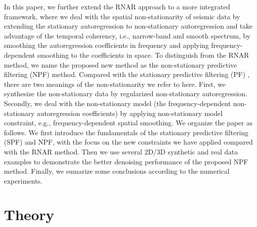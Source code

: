 In this paper, we further extend the RNAR approach to a more integrated framework, where we deal with the spatial non-stationarity of seismic data by extending the stationary autoregression to non-stationary autoregression and take advantage of the temporal coherency, i.e., narrow-band and smooth spectrum, by smoothing the autoregression coefficients in frequency and applying frequency-dependent smoothing to the coefficients in space.  To distinguish from the RNAR method, we name the proposed new method as the non-stationary predictive filtering (NPF) method. Compared with the stationary predictive filtering (PF) \cite[]{canales1984}, there are two meanings of the non-stationarity we refer to here. First, we synthesize the non-stationary data by regularized non-stationary autoregression. Secondly, we deal with the non-stationary model (the frequency-dependent non-stationary autoregression coefficients) by applying non-stationary model constraint, e.g., frequency-dependent spatial smoothing. We organize the paper as follows. We first introduce the fundamentals of the stationary predictive filtering (SPF) and NPF, with the focus on the new constraints we have applied compared with the RNAR method. Then we use several 2D/3D synthetic and real data examples to demonstrate the better denoising performance of the proposed NPF method. Finally, we sumarize some conclusions according to the numerical experiments.


\section{Theory}
